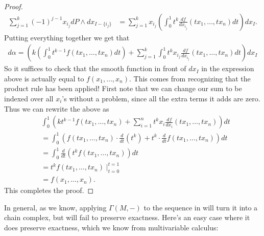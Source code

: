 \documentclass[11pt]{book}
\begin{document}
\begin{proof}
\begin{align*}
    \sum_{j=1}^k (-1)^{j-1}x_{i_j} dP\wedge dx_{I\minus\{i_j\}} &= \sum_{j=1}^k x_{i_j} \left( \int_0^1 t^k\frac{df}{dx_{i_j}}(tx_1, \ldots, tx_n) dt \right) dx_I.
\end{align*}
Putting everything together we get that
\begin{align*}
    d\alpha = \left( k \left( \int_0^1 t^{k-1} f(tx_1, \ldots, tx_n) dt \right) + \sum_{j=1}^k \int_0^1 t^k x_{i_j}\frac{df}{dx_{i_j}}(tx_1, \ldots, tx_n) dt\right)dx_I
\end{align*}
So it suffices to check that the smooth function in front of $dx_I$ in the expression above is actually equal to $f(x_1, \ldots, x_n)$. This comes from recognizing that the product rule has been applied! First note that we can change our sum to be indexed over all $x_i$'s without a problem, since all the extra terms it adds are zero. Thus we can rewrite the above as
\begin{align*}
    &\int_0^1 \left( k t^{k-1} f(tx_1, \ldots, tx_n) + \sum_{i=1}^n t^k x_i \frac{df}{dx_i}(tx_1, \ldots, tx_n) \right)dt \\
    &= \int_0^1 \left( f(tx_1, \ldots, tx_n)\cdot\frac{d}{dt}(t^k) + t^k\cdot \frac{d}{dt} f(tx_1, \ldots, tx_n)\right)dt \\
    &= \int_0^1 \frac{d}{dt} \left( t^k f(tx_1, \ldots, tx_n) \right)dt \\
    &= t^k f(tx_1, \ldots, tx_n) \mid_{t=0}^{t=1} \\
    &= f(x_1, \ldots, x_n).
\end{align*}
This completes the proof.
\end{proof}

In general, as we know, applying $\Gamma(M,-)$ to the sequence in  will turn it into a chain complex, but will fail to preserve exactness. Here's an easy case where it does preserve exactness, which we know from multivariable calculus:
\end{document}
